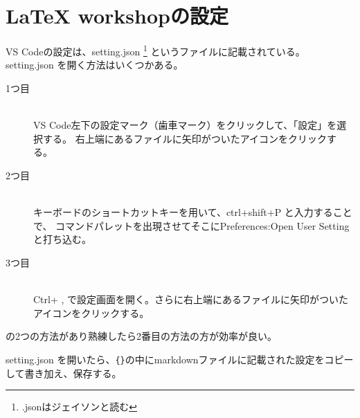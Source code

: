 \documentclass{ltjsarticle}
\begin{document}
\section{LaTeX workshopの設定}
VS Codeの設定は、setting.json
\footnote{.jsonはジェイソンと読む}
というファイルに記載されている。
setting.json を開く方法はいくつかある。
\begin{description}
  \item[1つ目] ~\\
    VS Code左下の設定マーク（歯車マーク）をクリックして、「設定」を選択する。
    右上端にあるファイルに矢印がついたアイコンをクリックする。
  \item[2つ目] ~\\
    キーボードのショートカットキーを用いて、ctrl+shift+P と入力することで、
    コマンドパレットを出現させてそこにPreferences:Open User Setting
    と打ち込む。
  \item[3つ目]~\\
    Ctrl+ , で設定画面を開く。さらに右上端にあるファイルに矢印がついたアイコンをクリックする。
\end{description}
の2つの方法があり熟練したら2番目の方法の方が効率が良い。

setting.json を開いたら、\verb|{}|の中にmarkdownファイルに記載された設定をコピーして書き加え、保存する。
\end{document}
